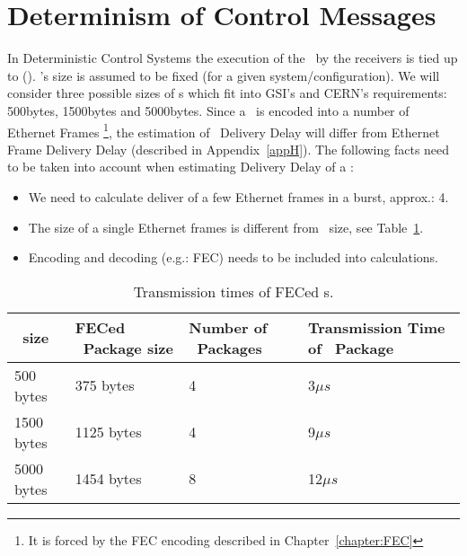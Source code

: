 \section{Determinism of Control Messages}
\label{chap:deter_control_message}


In Deterministic Control Systems the execution of the \ControlMessage\ by the
receivers is tied up to \GranularityWindow (\GW). \ControlMessage's size is
assumed to be fixed (for a given system/configuration). We will consider three
possible sizes of \ControlMessage s which fit into GSI's and CERN's
requirements: 500bytes, 1500bytes and 5000bytes. Since a \ControlMessage\ is
encoded into a number of Ethernet Frames \footnote{It is forced by the FEC
encoding described in Chapter~\ref{chapter:FEC}}, the estimation of
\ControlMessage\ Delivery Delay will differ from Ethernet Frame Delivery Delay
(described in Appendix~\ref{appH}). The following facts need to be taken into
account when estimating Delivery Delay of a \ControlMessage:
\begin{itemize}
  \item We need to calculate deliver of a few Ethernet frames in a burst,
approx.: 4.
  \item The size of a single Ethernet frames is different from \ControlMessage\
size, see Table~\ref{tab:FECedSize}.
  \item Encoding and decoding (e.g.: FEC) needs to be included into
calculations.
\end{itemize}


\begin{table}[ht]
\caption{Transmission times of FECed \ControlMessage s.} 
\centering
	\begin{tabular}{| p{2.5cm} | p{2.5cm} | p{2.5cm} | p{4cm} |}  \hline
\textbf{\ControlMessage\ size}&\textbf{FECed \HP\ Package size} &\textbf{Number
of \HP\ Packages}& \textbf{Transmission Time of \HP\ Package}\\ \hline
500 bytes  & 375 bytes       & 4   & 3$\mu s$      \\ \hline
1500 bytes & 1125 bytes      & 4   & 9$\mu s$      \\ \hline
5000 bytes & 1454 bytes      & 8   & 12$\mu s$      \\ \hline

\end{tabular}
\label{tab:FECedSize}
\end{table}


